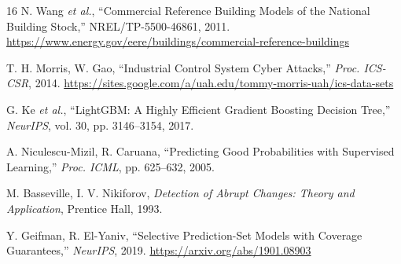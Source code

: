 \documentclass[12pt, a4paper]{article}
\begin{document}
\begin{thebibliography}{16}
N. Wang \emph{et al.}, ``Commercial Reference Building Models of the National Building Stock,'' NREL/TP-5500-46861, 2011. \url{https://www.energy.gov/eere/buildings/commercial-reference-buildings}

T. H. Morris, W. Gao, ``Industrial Control System Cyber Attacks,'' \emph{Proc. ICS-CSR}, 2014. \url{https://sites.google.com/a/uah.edu/tommy-morris-uah/ics-data-sets}

G. Ke \emph{et al.}, ``LightGBM: A Highly Efficient Gradient Boosting Decision Tree,'' \emph{NeurIPS}, vol. 30, pp. 3146--3154, 2017.

A. Niculescu-Mizil, R. Caruana, ``Predicting Good Probabilities with Supervised Learning,'' \emph{Proc. ICML}, pp. 625--632, 2005.

M. Basseville, I. V. Nikiforov, \emph{Detection of Abrupt Changes: Theory and Application}, Prentice Hall, 1993.

Y. Geifman, R. El-Yaniv, ``Selective Prediction-Set Models with Coverage Guarantees,'' \emph{NeurIPS}, 2019. \url{https://arxiv.org/abs/1901.08903}

\end{thebibliography}
\end{document}
